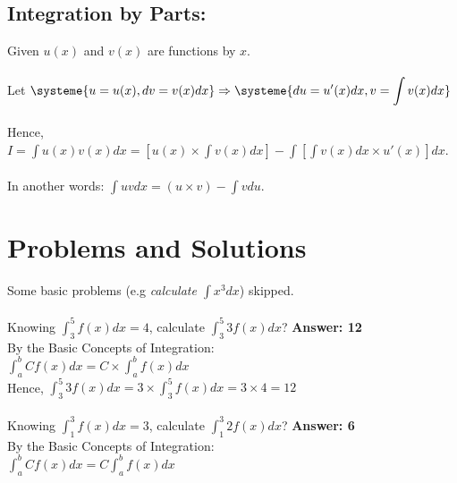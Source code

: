 \documentclass{article}
\begin{document}
    \subsection{Integration by Parts:}
    Given $u(x)$ and $v(x)$ are functions by $x$.\\\\
    Let $\displaystyle \systeme{u = u(x), dv = v(x) dx} \Rightarrow \systeme{du = u'(x)dx, v = \int v(x) dx}$\\\\
    Hence, $\displaystyle I = \int u(x)v(x) dx = [u(x)\times\int v(x) dx] - \int[\int v(x) dx \times u'(x)]dx$.\\\\
    In another words: $\displaystyle \int uv dx = (u\times v) - \int vdu$.

    \section{Problems and Solutions}
    Some basic problems (e.g \textit{calculate $\displaystyle \int x^3 dx$}) skipped.

    \paragraph{\cite{9@116}} Knowing $\displaystyle \int_{3}^{5} f(x) dx = 4$, calculate $\displaystyle \int_{3}^{5} 3f(x) dx$? \textbf{Answer: 12}\\

    By the Basic Concepts of Integration:\\

    $\displaystyle\int_{a}^{b} Cf(x) dx = C\times\int_{a}^{b} f(x) dx$\\

    Hence, $\displaystyle\int_{3}^{5} 3f(x) dx = 3\times\int_{3}^{5} f(x) dx = 3 \times 4 = 12$

    \paragraph{\cite{8@109}} Knowing $\displaystyle \int_{1}^{3} f(x) dx = 3$, calculate $\displaystyle \int_{1}^{3} 2f(x) dx$? \textbf{Answer: 6}\\

    By the Basic Concepts of Integration:\\

    $\displaystyle \int_{a}^{b} Cf(x) dx = C\int_{a}^{b} f(x) dx$\\\\
\end{document}
